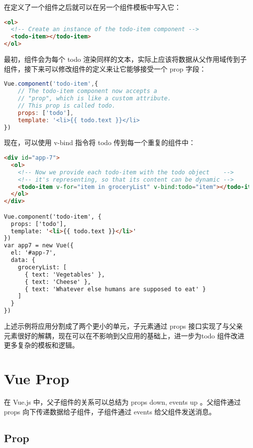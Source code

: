 在定义了一个组件之后就可以在另一个组件模板中写入它：

\begin{lstlisting}[language=HTML]
<ol>
  <!-- Create an instance of the todo-item component -->
  <todo-item></todo-item>
</ol>
\end{lstlisting}

最初，组件会为每个 todo 渲染同样的文本，实际上应该将数据从父作用域传到子组件，接下来可以修改组件的定义来让它能够接受一个 prop 字段：


\begin{lstlisting}[language=JavaScript]
Vue.component('todo-item',{
    // The todo-item component now accepts a
    // "prop", which is like a custom attribute.
    // This prop is called todo.
    props: ['todo'],
    template: '<li>{{ todo.text }}</li>
})
\end{lstlisting}

现在，可以使用 v-bind 指令将 todo 传到每一个重复的组件中：



\begin{lstlisting}[language=HTML]
<div id="app-7">
  <ol>
    <!-- Now we provide each todo-item with the todo object    -->
    <!-- it's representing, so that its content can be dynamic -->
    <todo-item v-for="item in groceryList" v-bind:todo="item"></todo-item>
  </ol>
</div>

Vue.component('todo-item', {
  props: ['todo'],
  template: '<li>{{ todo.text }}</li>'
})
var app7 = new Vue({
  el: '#app-7',
  data: {
    groceryList: [
      { text: 'Vegetables' },
      { text: 'Cheese' },
      { text: 'Whatever else humans are supposed to eat' }
    ]
  }
})
\end{lstlisting}


上述示例将应用分割成了两个更小的单元，子元素通过 props 接口实现了与父亲元素很好的解耦，现在可以在不影响到父应用的基础上，进一步为todo 组件改进更多复杂的模板和逻辑。

\chapter{Vue Prop}


在 Vue.js 中，父子组件的关系可以总结为 props down, events up 。父组件通过 props 向下传递数据给子组件，子组件通过 events 给父组件发送消息。


\section{Prop}



